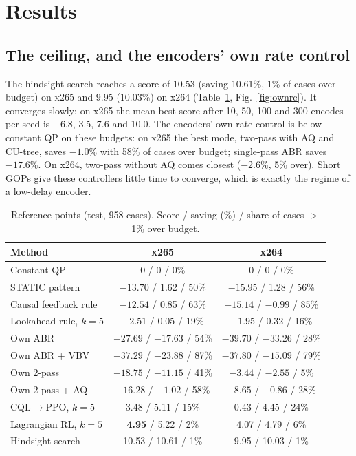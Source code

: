 \documentclass[conference]{IEEEtran}
\newcommand{\cqlppo}{CQL$\to$PPO}
\begin{document}
\section{Results}
\subsection{The ceiling, and the encoders' own rate control}
The hindsight search reaches a score of 10.53 (saving 10.61\%, 1\% of cases over budget) on x265 and 9.95 (10.03\%) on x264 (Table~\ref{tab:ref}, Fig.~\ref{fig:ownrc}). It converges slowly: on x265 the mean best score after 10, 50, 100 and 300 encodes per seed is $-6.8$, 3.5, 7.6 and 10.0. The encoders' own rate control is below constant QP on these budgets: on x265 the best mode, two-pass with AQ and CU-tree, saves $-1.0\%$ with 58\% of cases over budget; single-pass ABR saves $-17.6\%$. On x264, two-pass without AQ comes closest ($-2.6\%$, 5\% over). Short GOPs give these controllers little time to converge, which is exactly the regime of a low-delay encoder.

\begin{table}[t]
\centering\footnotesize
\caption{Reference points (test, 958 cases). Score / saving (\%) / share of cases $>$1\% over budget.}
\label{tab:ref}
\setlength{\tabcolsep}{2pt}
\begin{tabular}{@{}lcc@{}}
\toprule
Method & x265 & x264\\
\midrule
Constant QP & 0 / 0 / 0\% & 0 / 0 / 0\%\\
STATIC pattern & $-13.70$ / 1.62 / 50\% & $-15.95$ / 1.28 / 56\%\\
Causal feedback rule & $-12.54$ / 0.85 / 63\% & $-15.14$ / $-0.99$ / 85\%\\
Lookahead rule, $k{=}5$ & $-2.51$ / 0.05 / 19\% & $-1.95$ / 0.32 / 16\%\\
Own ABR & $-27.69$ / $-17.63$ / 54\% & $-39.70$ / $-33.26$ / 28\%\\
Own ABR + VBV & $-37.29$ / $-23.88$ / 87\% & $-37.80$ / $-15.09$ / 79\%\\
Own 2-pass & $-18.75$ / $-11.15$ / 41\% & $-3.44$ / $-2.55$ / 5\%\\
Own 2-pass + AQ & $-16.28$ / $-1.02$ / 58\% & $-8.65$ / $-0.86$ / 28\%\\
\midrule
\cqlppo, $k{=}5$ & 3.48 / 5.11 / 15\% & 0.43 / 4.45 / 24\%\\
Lagrangian RL, $k{=}5$ & \textbf{4.95} / 5.22 / 2\% & 4.07 / 4.79 / 6\%\\
\midrule
Hindsight search & 10.53 / 10.61 / 1\% & 9.95 / 10.03 / 1\%\\
\bottomrule
\end{tabular}
\end{table}
\end{document}
